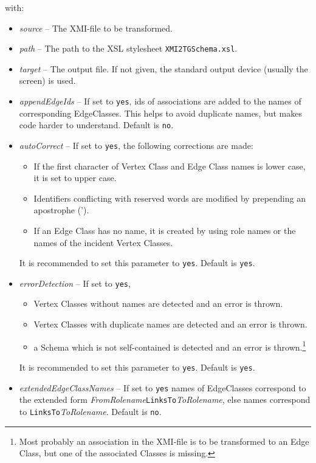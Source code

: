 \documentclass[a4paper]{article}
\begin{document}
	with:
	\begin{itemize}
		\item \emph{source} -- The XMI-file to be transformed.
		\item \emph{path} -- The path to the XSL stylesheet \texttt{XMI2TGSchema.xsl}.
		\item \emph{target} -- The output file. If not given, the standard output device (usually the screen) is used.
	\end{itemize}
	\begin{itemize}
		\item \emph{appendEdgeIds} -- If set to \texttt{yes}, ids of associations are added to the names of corresponding EdgeClasses. This helps to avoid duplicate names, but makes code harder to understand. Default is \texttt{no}.
		\item \emph{autoCorrect} -- If set to \texttt{yes}, the following corrections are made:
		\begin{itemize}
			\item If the first character of Vertex Class and Edge Class names is lower case, it is set to upper case.
			\item Identifiers conflicting with reserved words are modified by prepending an apostrophe (').
			\item If an Edge Class has no name, it is created by using role names or the names of the incident Vertex Classes. 
		\end{itemize}
		It is recommended to set this parameter to \texttt{yes}. Default is \texttt{yes}.
		\item \emph{errorDetection} -- If set to \texttt{yes},
		\begin{itemize}
			\item Vertex Classes without names are detected and an error is thrown.
			\item Vertex Classes with duplicate names are detected and an error is thrown.
			\item a Schema which is not self-contained is detected and an error is thrown.\footnote{Most probably an association in the XMI-file is to be transformed to an Edge Class, but one of the associated Classes is missing.}
		\end{itemize}
		It is recommended to set this parameter to \texttt{yes}. Default is \texttt{yes}.
		\item \emph{extendedEdgeClassNames} --  If set to \texttt{yes} names of EdgeClasses correspond to the extended form \emph{FromRolename}\texttt{LinksTo}\emph{ToRolename}, else names correspond to \texttt{LinksTo}\emph{ToRolename}. Default is \texttt{no}.

\end{itemize}
\end{document}
